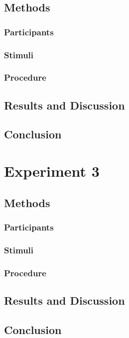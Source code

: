 \documentclass[man]{apa2}
\begin{document}
\subsection{Methods}

\subsubsection{Participants} 
\subsubsection{Stimuli}



\subsubsection{Procedure}

\subsection{Results and Discussion}

\subsection{Conclusion}



\section{Experiment 3}

\subsection{Methods}

\subsubsection{Participants} 
\subsubsection{Stimuli}


\subsubsection{Procedure}

\subsection{Results and Discussion}

\subsection{Conclusion}






\newpage
\theappendix 

\section{}
\end{document}
